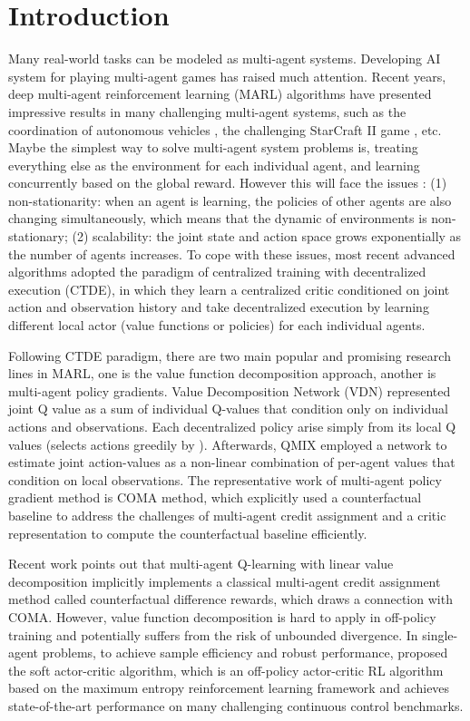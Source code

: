 \documentclass[runningheads]{llncs}
\begin{document}
\section{Introduction}
Many real-world tasks can be modeled as multi-agent systems. Developing AI system for playing multi-agent games has raised much
attention. 
Recent years, deep multi-agent reinforcement learning (MARL) algorithms \cite{b1} have presented impressive results in many challenging multi-agent systems, such as the coordination of autonomous vehicles \cite{b2}, the challenging StarCraft II game \cite{b3}, etc. Maybe the simplest way to solve multi-agent system problems is, treating everything else as the environment for each individual agent, and learning concurrently based on the global reward. However this will face the issues \cite{b4}: (1) non-stationarity: when an agent is learning, the policies of other agents are also changing simultaneously, which means that the dynamic of environments is non-stationary; (2) scalability:
the joint state and action space grows exponentially as the number of agents increases.
To cope with these issues, 
most recent advanced algorithms adopted the paradigm of centralized training with decentralized execution (CTDE)\cite{b5}, in which they learn a centralized critic conditioned on joint action and observation history and take decentralized execution by learning different local actor (value functions or policies) for each individual agents. 


Following CTDE paradigm, there are two main popular and promising research lines in MARL, one is the value function decomposition approach, another is multi-agent policy gradients. Value Decomposition Network (VDN) \cite{b6} represented joint Q value  as a sum of individual Q-values  that condition only on individual actions and observations. Each decentralized policy arise simply from its local Q values  (selects actions greedily by ). Afterwards, QMIX \cite{b7} employed a network to estimate joint action-values as a non-linear combination of per-agent values that condition on local observations. The representative work of multi-agent policy gradient method is COMA \cite{b8} method, which explicitly used a counterfactual baseline to address the challenges of multi-agent credit assignment and a critic representation to compute the counterfactual baseline efficiently.

Recent work \cite{b16} points out that multi-agent Q-learning with linear value decomposition implicitly implements a classical multi-agent credit assignment method called counterfactual difference rewards, which draws a connection with COMA. 
However, value function decomposition is hard to apply in off-policy training and potentially suffers from the risk of unbounded divergence.
In single-agent problems, to achieve sample efficiency and robust performance, \cite{b6} proposed the soft actor-critic algorithm, which is an off-policy actor-critic RL algorithm based on the maximum entropy reinforcement learning framework and achieves state-of-the-art performance on many challenging continuous control benchmarks. 
\end{document}
